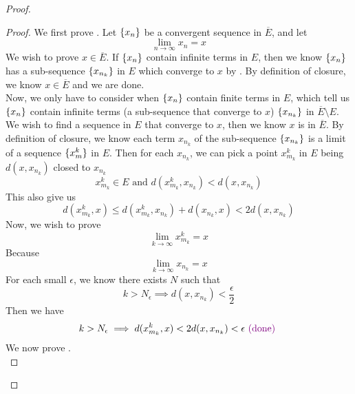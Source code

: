 \documentclass{report}
\begin{document}
\begin{proof}
\begin{proof}
We first prove . Let $\{ x_n \}$ be a convergent sequence in $\overline{E}$, and let
\begin{equation}
\lim_{n\to\infty} x_n=x
\end{equation}
We wish to prove $x\in \overline{E}$. If $\{ x_n \}$ contain infinite terms in $E$, then we know $\{ x_n \}$ has a sub-sequence $\{ x_{n_k} \}$ in $E$ which converge to $x$ by  . By definition of closure, we know $x\in \overline{E}$ and we are done.\\

Now, we only have to consider when $\{ x_n \}$ contain finite terms in $E$, which tell us $\{ x_n \}$ contain infinite terms (a sub-sequence that converge to $x$) $\{ x_{n_k} \}$ in $\overline{E}\setminus E$.\\

We wish to find a sequence in $E$ that converge to  $x$, then we know  $x$ is in $\overline{E}$. By definition of closure, we know each term $x_{n_k}$ of the sub-sequence $\{ x_{n_k} \}$ is a limit of a sequence $\{ x^k_m \}$ in $E$. Then for each $x_{n_k}$, we can pick a point $x^k_{m_k}$ in $E$ being $d(x,x_{n_k})$ closed to $x_{n_k}$ 
\begin{equation}
x_{m_k}^k\in E\text{ and }d(x^k_{m_k},x_{n_k})<d(x,x_{n_k})
\end{equation}
This also give us
\begin{equation}
d(x_{m_k}^k,x)\leq d(x_{m_k}^k,x_{n_k})+d(x_{n_k},x)<2d(x,x_{n_k})
\end{equation}
Now, we wish to prove 
\begin{equation}
\lim_{k\to\infty}x^k_{m_k}=x
\end{equation}
Because
\begin{equation}
\lim_{k\to\infty}x_{n_k}=x
\end{equation}
For each small $\epsilon $, we know there exists $N$ such that
\begin{equation}
k>N_\epsilon \implies d(x,x_{n_k})<\frac{\epsilon}{2} 
\end{equation}
Then we have
\begin{equation}
k>N_\epsilon \implies d(x^k_{m_k},x)<2d(x,x_{n_k})<\epsilon \textcolor{violet}{\text{ (done) }}
\end{equation}
We now prove .\\ 


\end{proof}
\end{proof}
\end{document}
